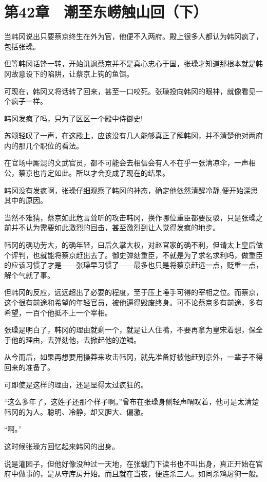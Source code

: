 \section{第42章　潮至东崂触山回（下）}

当韩冈说出只要蔡京终生在外为官，他便不入两府。殿上很多人都认为韩冈疯了，包括张璪。

但等韩冈话锋一转，开始讥讽蔡京并不是真心忠心于国，张璪才知道那根本就是韩冈故意设下的陷阱，让蔡京上钩的鱼饵。

可现在，韩冈又将话转了回来，甚至一口咬死。张璪投向韩冈的眼神，就像看见一个疯子一样。

韩冈发疯了吗，只为了区区一个殿中侍御史!

苏颂轻叹了一声，在这殿上，应该没有几人能够真正了解韩冈，并不清楚他对两府内的那几个职位的看法。

在官场中厮混的文武官员，都不可能会去相信会有人不在乎一张清凉伞，一声相公，蔡京也肯定如此。所以才会变成了现在的结果。

韩冈没有发疯啊，张璪仔细观察了韩冈的神态，确定他依然清醒冷静,便开始深思其中的原因。

当然不难猜，蔡京如此危言耸听的攻击韩冈，换作哪位重臣都要反驳，只是张璪之前并不认为需要如此激烈的回击，甚至激烈到让人觉得发疯的地步。

韩冈的确功劳大，的确年轻，曰后久掌大权，对赵官家的确不利，但请太上皇后做个评判，也就能将蔡京赶出去了。御史弹劾重臣，不就是为了求名求利吗，做重臣的应该习惯了才是——张璪早习惯了——最多也只是将蔡京赶远一点，贬重一点，解个气就了事。

但韩冈的反应，远远超出了必要的程度，至于压上唾手可得的宰相之位。而蔡京，这个很有前途和希望的年轻官员，被他逼得毁废终身。可不论蔡京多有前途，多有希望，一百个他抵不上一个宰相。

张璪是明白了，韩冈的理由就剩一个，就是让人住嘴，不要再拿为皇宋着想，保全于他的理由，去弹劾他，去掀起他的逆鳞。

从今而后，如果再想要用操莽来攻击韩冈，就先准备好被他赶到京外，一辈子不得回来的准备了。

可即使是这样的理由，还是显得太过疯狂的。

“这么多年了，这姓子还那个样子啊。”曾布在张璪身侧轻声喟叹着，他可是太清楚韩冈的为人。聪明、冷静，却又胆大、偏激。

“啊。”

这时候张璪方回忆起来韩冈的出身。

说是灌园子，但他好像没种过一天地，在张载门下读书也不叫出身，真正开始在官府中做事的，是从守库房开始。而且就在当夜，便连杀三人。如同杀鸡屠狗一般。

